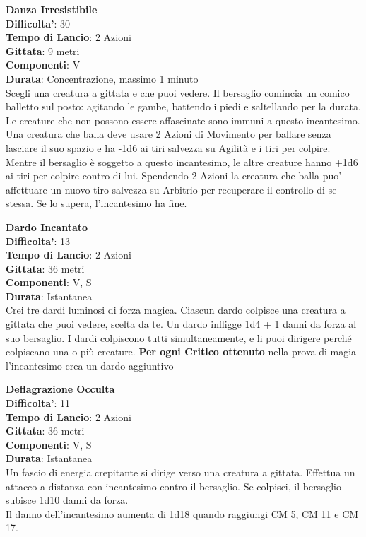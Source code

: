 \begin{multicols}{2}
\medskip\textbf{Danza Irresistibile}\\
\textbf{Difficolta'}: 30\\
\textbf{Tempo di Lancio}: 2 Azioni\\
\textbf{Gittata}: 9 metri\\
\textbf{Componenti}: V\\
\textbf{Durata}: Concentrazione, massimo 1 minuto\\
Scegli una creatura a gittata e che puoi vedere. Il bersaglio comincia un comico balletto sul posto: agitando le gambe, battendo i piedi e saltellando per la durata. Le creature che non possono essere affascinate sono immuni a questo incantesimo.\\
Una creatura che balla deve usare 2 Azioni di Movimento per ballare senza lasciare il suo spazio e ha -1d6 ai tiri salvezza su Agilità e i tiri per colpire. Mentre il bersaglio è soggetto a questo incantesimo, le altre creature hanno +1d6 ai tiri per colpire contro di lui. Spendendo 2 Azioni la creatura che balla puo' affettuare un nuovo tiro salvezza su Arbitrio per
recuperare il controllo di se stessa. Se lo supera, l’incantesimo ha fine.

\medskip\textbf{Dardo Incantato}\\
\textbf{Difficolta'}: 13\\
\textbf{Tempo di Lancio}: 2 Azioni\\
\textbf{Gittata}: 36 metri\\
\textbf{Componenti}: V, S\\
\textbf{Durata}: Istantanea\\
Crei tre dardi luminosi di forza magica. Ciascun dardo colpisce una creatura a gittata che puoi vedere, scelta da te. Un dardo infligge 1d4 + 1 danni da forza al suo bersaglio. I dardi colpiscono tutti simultaneamente, e li puoi dirigere perché colpiscano una o più creature.
\textbf{Per ogni Critico ottenuto} nella prova di magia l’incantesimo crea un dardo aggiuntivo

\medskip\textbf{Deflagrazione Occulta}\\
\textbf{Difficolta'}: 11\\
\textbf{Tempo di Lancio}: 2 Azioni\\
\textbf{Gittata}: 36 metri\\
\textbf{Componenti}: V, S\\
\textbf{Durata}: Istantanea\\
Un fascio di energia crepitante si dirige verso una creatura a gittata. Effettua un attacco a distanza con  incantesimo contro il bersaglio. Se colpisci, il bersaglio subisce 1d10 danni da forza.\\
Il danno dell’incantesimo aumenta di 1d18 quando raggiungi CM 5, CM 11 e CM 17.


\end{multicols}
